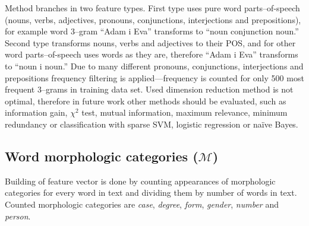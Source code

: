 \documentclass[11pt,english]{article}
\begin{document}
\begin{multicols}{2}
Method branches in two feature types. First type uses pure word parts--of-speech
(nouns, verbs, adjectives, pronouns, conjunctions, interjections and prepositions), for
example word 3--gram ``Adam i Eva'' transforms to ``noun conjunction noun.''
Second type transforms nouns, verbs and adjectives to their POS, and for other
word parts--of-speech uses words as they are, therefore ``Adam i Eva'' transforms to
``noun i noun.'' Due to many different pronouns, conjunctions, interjections and
prepositions frequency filtering is applied---frequency is counted for only 500
most frequent 3--grams in training data set. Used dimension reduction method is
not optimal, therefore in future work other methods should be evaluated, such as
information gain, $\chi^2$ test, mutual information, maximum relevance, minimum
redundancy or classification with sparse SVM, logistic regression or na\"ive
Bayes.

\subsection{Word morphologic categories ($\mathcal{M}$)}
\label{sec:morphosyntactic}
Building of feature vector is done by counting appearances of morphologic
categories for every word in text and dividing them by number of words in text.
Counted morphologic categories are \emph{case}, \emph{degree}, \emph{form},
\emph{gender}, \emph{number} and \emph{person}.

\end{multicols}
\end{document}

